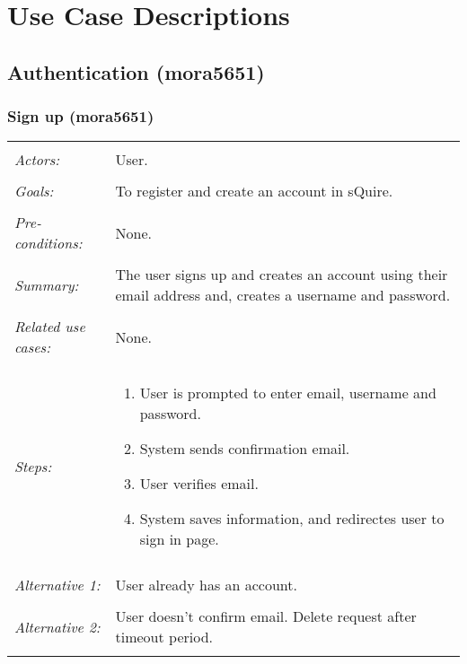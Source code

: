 \documentclass[11pt]{report}
\begin{document}

\chapter{Use Case Descriptions}

\section{Authentication (mora5651)}
\subsection{Sign up (mora5651)}
\begin{tabular}{ p{2cm} p{12cm} }
 \hline
 \\
 \textit{Actors:} & User. \\ 
 \\
 \textit{Goals:} & To register and create an account in sQuire. \\
 \\
 \textit{Pre-conditions:} & None. \\
 \\
 \textit{Summary:} & The user signs up and creates an account using their email address and, creates a username and password. \\ 
 \\
 \textit{Related use cases:} & None. \\ 
 \\
 \textit{Steps:} & \begin{enumerate}
  \item User is prompted to enter email, username and password. 
  \item System sends confirmation email. 
  \item User verifies email. 
  \item System saves information, and redirectes user to sign in page. 
 \end{enumerate} \\
 \\
 \textit{Alternative 1:} & User already has an account. \\ 
 \\
 \textit{Alternative 2:} & User doesn't confirm email. Delete request after timeout period. \\
 \\
\hline
\end{tabular}
\end{document}
